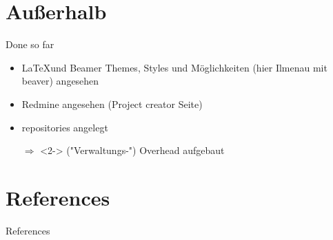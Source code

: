 \documentclass{beamer}
\begin{document}
\section{Außerhalb}
\begin{frame}{Done so far}
\begin{itemize}
	\item \LaTeX und Beamer Themes, Styles und Möglichkeiten (hier Ilmenau mit beaver) angesehen
	\item Redmine angesehen (Project creator Seite)
	\item repositories angelegt
	\item[$\Rightarrow$]<2-> ("Verwaltungs-") Overhead aufgebaut
\end{itemize}
\end{frame}


\section{References}
\begin{frame}[shrink=10]{References}
\nocite{*}

 
\end{frame}
\end{document}
